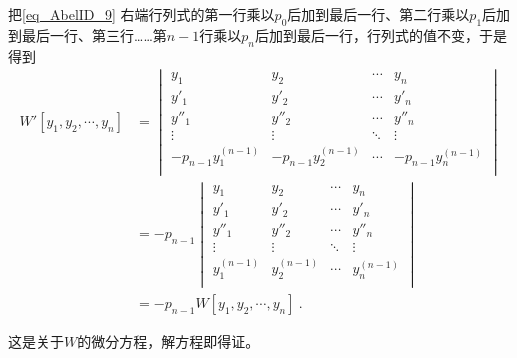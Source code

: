 把\autoref{eq_AbelID_9}  右端行列式的第一行乘以$p_0$后加到最后一行、第二行乘以$p_1$后加到最后一行、第三行……第$n-1$行乘以$p_n$后加到最后一行，行列式的值不变，于是得到
\begin{equation}\label{eq_AbelID_10}
\begin{aligned}
W'[y_1, y_2, \cdots, y_n] &= 
\begin{vmatrix}
y_1&y_2&\cdots&y_n\\
y'_1&y'_2&\cdots&y'_n\\
y''_1&y''_2&\cdots&y''_n\\
\vdots&\vdots&\ddots&\vdots\\
-p_{n-1}y_1^{(n-1)}&-p_{n-1}y_2^{(n-1)}&\cdots&-p_{n-1}y_n^{(n-1)}\\
\end{vmatrix}\\
&=-p_{n-1}
\begin{vmatrix}
y_1&y_2&\cdots&y_n\\
y'_1&y'_2&\cdots&y'_n\\
y''_1&y''_2&\cdots&y''_n\\
\vdots&\vdots&\ddots&\vdots\\
y_1^{(n-1)}&y_2^{(n-1)}&\cdots&y_n^{(n-1)}\\
\end{vmatrix}\\
&= -p_{n-1}W[y_1, y_2, \cdots, y_n]~.
\end{aligned}
\end{equation}

这是关于$W$的微分方程，解方程即得证。
















